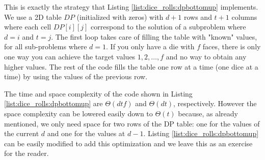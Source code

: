 This is exactly the strategy that Listing \ref{list:dice_rolls:dpbottomup} implements. We use a 2D
table $DP$ (initialized with zeros) with $d+1$ rows and $t+1$ columns where each cell $DP[i][j]$
correspond to the solution of a subproblem where $d=i$ and $t=j$. The first loop takes care of
filling the table with "known" values, for all sub-problems where $d=1$. If you only have a die with
$f$ faces, there is only one way you can achieve the target values $1,2,\ldots, f$ and no way to
obtain any higher values. The rest of the code fills the table one row at a time (one dice at a
time) by using the values of the previous row. 



The time and space complexity of the code shown in Listing \ref{list:dice_rolls:dpbottomup}
are $\Theta(dtf)$ and $\Theta(dt)$, respectively. However the space complexity can be lowered easily
down  to $\Theta(t)$ because, as already mentioned, we only need space for two rows of the DP table:
one for the values of the current $d$ and one for the values at $d-1$. Listing
\ref{list:dice_rolls:dpbottomup} can be easily modified to add this optimization and we leave this
as an exercise for the reader.



